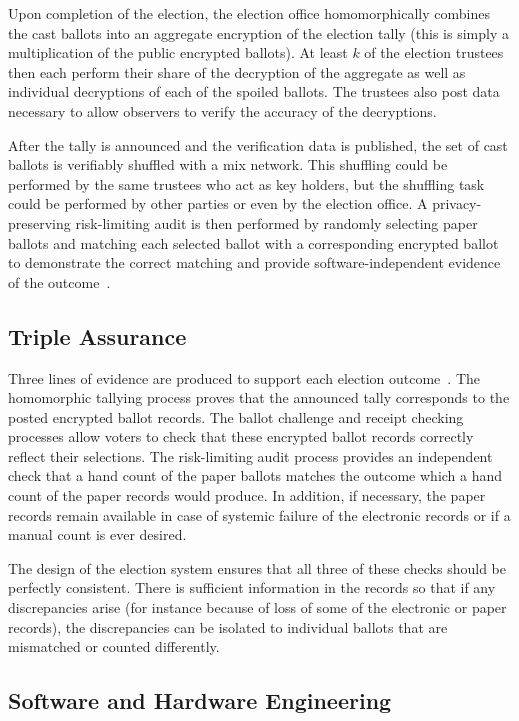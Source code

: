 Upon completion of the election, the election office homomorphically combines the cast ballots into an aggregate encryption of the election tally (this is simply a multiplication of the public encrypted ballots).  At least $k$ of the election trustees then each perform their share of the decryption of the aggregate as well as individual decryptions of each of the spoiled ballots.  The trustees also post data necessary to allow observers to verify the accuracy of the decryptions.

After the tally is announced and the verification data is published, the set of cast ballots is verifiably shuffled with a mix network.  This shuffling could be performed by the same trustees who act as key holders, but the shuffling task could be performed by other parties or even by the election office.  A privacy-preserving risk-limiting audit is then performed by randomly selecting paper ballots and matching each selected ballot with a corresponding encrypted ballot to demonstrate the correct matching and provide software-independent evidence of the outcome~\cite{rivest06sivoting,lindemanStark12}.

\subsection{Triple Assurance}

Three lines of evidence are produced to support each election outcome~\cite{starkWagner12}.  The homomorphic tallying process proves that the announced tally corresponds to the posted encrypted ballot records.  The ballot challenge and receipt checking processes allow voters to check that these encrypted ballot records correctly reflect their selections.  The risk-limiting audit process provides an independent check that a hand count of the paper ballots matches the outcome which a hand count of the paper records would produce.  In addition, if necessary, the paper records remain available in case of systemic failure of the electronic records or if a manual count is ever desired.

The design of the election system ensures that all three of these checks should be perfectly consistent.  There is sufficient information in the records so that if any discrepancies arise (for instance because of loss of some of the electronic or paper records), the discrepancies can be isolated to individual ballots that are mismatched or counted differently.

\subsection{Software and Hardware Engineering}

